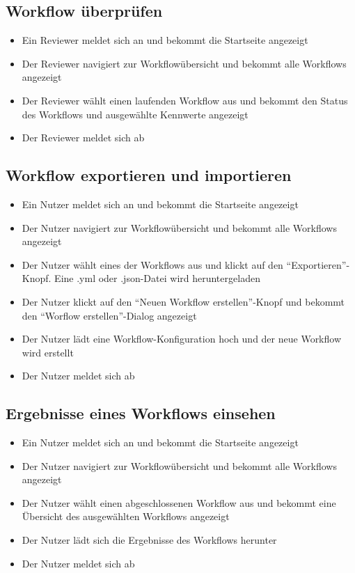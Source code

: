 %
\subsection*{Workflow überprüfen}
\begin{itemize}
    \item Ein \Gls{Reviewer} meldet sich an und bekommt die Startseite angezeigt
    \item Der \Gls{Reviewer} navigiert zur Workflowübersicht und bekommt alle Workflows angezeigt
    \item Der \Gls{Reviewer} wählt einen laufenden Workflow aus und bekommt den Status des Workflows und ausgewählte Kennwerte angezeigt
    \item Der \gls{Reviewer} meldet sich ab
\end{itemize}

\subsection*{Workflow exportieren und importieren}
\begin{itemize}
    \item Ein \gls{Nutzer} meldet sich an und bekommt die Startseite angezeigt
    \item Der \gls{Nutzer} navigiert zur Workflowübersicht und bekommt alle Workflows angezeigt
    \item Der \gls{Nutzer} wählt eines der Workflows aus und klickt auf den \enquote{Exportieren}-Knopf. Eine .yml oder .json-Datei wird heruntergeladen
    \item Der \gls{Nutzer} klickt auf den \enquote{Neuen Workflow erstellen}-Knopf und bekommt den \enquote{Worflow erstellen}-Dialog angezeigt
    \item Der \gls{Nutzer} lädt eine Workflow-Konfiguration hoch und der neue Workflow wird erstellt
    \item Der \gls{Nutzer} meldet sich ab
\end{itemize}


\subsection*{Ergebnisse eines Workflows einsehen}
\begin{itemize}
    \item Ein \gls{Nutzer} meldet sich an und bekommt die Startseite angezeigt
    \item Der \gls{Nutzer} navigiert zur Workflowübersicht und bekommt alle Workflows angezeigt
    \item Der \gls{Nutzer} wählt einen abgeschlossenen Workflow aus und bekommt eine Übersicht des ausgewählten Workflows angezeigt
    \item Der \gls{Nutzer} lädt sich die Ergebnisse des Workflows herunter
    \item Der \gls{Nutzer} meldet sich ab
\end{itemize}



